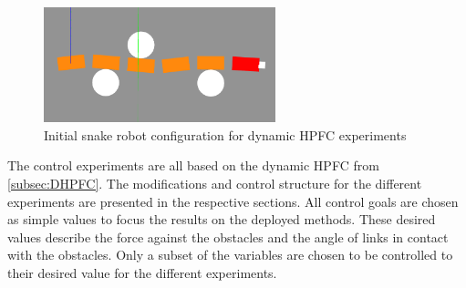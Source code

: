 \begin{figure}[h!]
    \centering
    \includegraphics[width=0.6\textwidth]{figures/experiments/initial-gazebo.png}
    \caption{Initial snake robot configuration for dynamic HPFC experiments}
    \label{fig:init-gazebo}
\end{figure}

The control experiments are all based on the dynamic HPFC from \ref{subsec:DHPFC}. The modifications and control structure for the different experiments are presented in the respective sections. All control goals are chosen as simple values to focus the results on the deployed methods. These desired values describe the force against the obstacles and the angle of links in contact with the obstacles. Only a subset of the variables are chosen to be controlled to their desired value for the different experiments. 